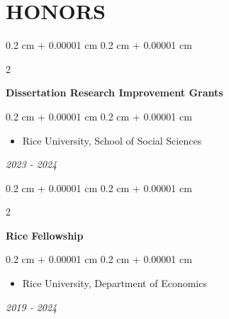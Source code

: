 \documentclass[10pt, letterpaper]{article}
\newenvironment{highlights}{
    \begin{itemize}[
        topsep=0.10 cm,
        parsep=0.10 cm,
        partopsep=0pt,
        itemsep=0.0 cm,
        leftmargin=0.4 cm + 10pt
    ]
}{
    \end{itemize}
} %
\newenvironment{onecolentry}{
    \begin{adjustwidth}{
        0.2 cm + 0.00001 cm
    }{
        0.2 cm + 0.00001 cm
    }
}{
    \end{adjustwidth}
} %
\newenvironment{twocolentry}[2][]{
    \onecolentry
    \def\secondColumn{#2}
    \setcolumnwidth{\fill, 4.5 cm}
    \begin{paracol}{2}
}{
    \switchcolumn \raggedleft \secondColumn
    \end{paracol}
    \endonecolentry
} %
\begin{document}
    \section{HONORS}
    \begin{samepage}
        \begin{twocolentry}{
            \textit{2023 - 2024}
        }
            \textbf{Dissertation Research Improvement Grants}
            \vspace{0.10 cm}
            \begin{onecolentry}
                \begin{highlights}
                    \item Rice University, School of Social Sciences
                \end{highlights}
            \end{onecolentry}
        \end{twocolentry}
    \end{samepage}
    \vspace{0.10 cm}
    \begin{samepage}
        \begin{twocolentry}{
            \textit{2019 - 2024}
        }
            \textbf{Rice Fellowship}
            \vspace{0.10 cm}
            \begin{onecolentry}
                \begin{highlights}
                    \item Rice University, Department of Economics
                \end{highlights}
            \end{onecolentry}
        \end{twocolentry}
    \end{samepage}
\end{document}
